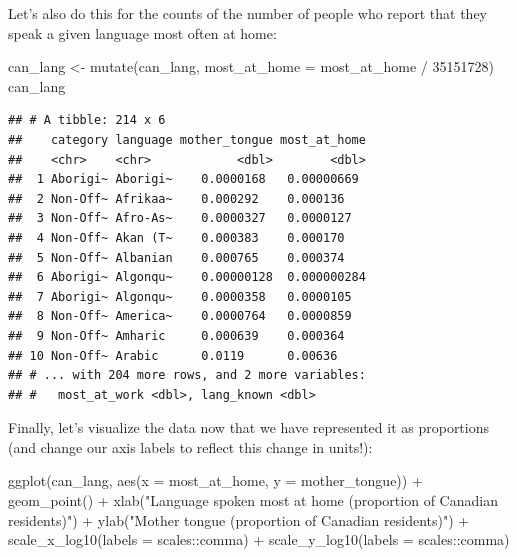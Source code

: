 \documentclass[
]{krantz}
\makeatletter
\newenvironment{Shaded}{\begin{snugshade}}{\end{snugshade}}
\newcommand{\AttributeTok}[1]{\textcolor[rgb]{0.61,0.61,0.61}{#1}}
\newcommand{\DecValTok}[1]{\textcolor[rgb]{0.06,0.06,0.06}{#1}}
\newcommand{\FunctionTok}[1]{\textcolor[rgb]{0,0,0}{#1}}
\newcommand{\NormalTok}[1]{#1}
\newcommand{\OtherTok}[1]{\textcolor[rgb]{0.37,0.37,0.37}{#1}}
\newcommand{\SpecialCharTok}[1]{\textcolor[rgb]{0,0,0}{#1}}
\newcommand{\StringTok}[1]{\textcolor[rgb]{0.5,0.5,0.5}{#1}}
\newenvironment{kframe}{%
\medskip{}
\setlength{\fboxsep}{.8em}
 \def\at@end@of@kframe{}%
 \ifinner\ifhmode%
  \def\at@end@of@kframe{\end{minipage}}%
  \begin{minipage}{\columnwidth}%
 \fi\fi%
 \def\FrameCommand##1{\hskip\@totalleftmargin \hskip-\fboxsep
 \colorbox{shadecolor}{##1}\hskip-\fboxsep
     \hskip-\linewidth \hskip-\@totalleftmargin \hskip\columnwidth}%
 \MakeFramed {\advance\hsize-\width
   \@totalleftmargin\z@ \linewidth\hsize
   \@setminipage}}%
 {\par\unskip\endMakeFramed%
 \at@end@of@kframe}
\renewenvironment{Shaded}{\begin{kframe}}{\end{kframe}}
\makeatother
\begin{document}
Let's also do this for the counts of the number of people who report that they speak a given language most often at home:

\begin{Shaded}
\begin{Highlighting}[]
\NormalTok{can\_lang }\OtherTok{\textless{}{-}} \FunctionTok{mutate}\NormalTok{(can\_lang, }\AttributeTok{most\_at\_home =}\NormalTok{ most\_at\_home }\SpecialCharTok{/} \DecValTok{35151728}\NormalTok{)}
\NormalTok{can\_lang}
\end{Highlighting}
\end{Shaded}

\begin{verbatim}
## # A tibble: 214 x 6
##    category language mother_tongue most_at_home
##    <chr>    <chr>            <dbl>        <dbl>
##  1 Aborigi~ Aborigi~    0.0000168   0.00000669 
##  2 Non-Off~ Afrikaa~    0.000292    0.000136   
##  3 Non-Off~ Afro-As~    0.0000327   0.0000127  
##  4 Non-Off~ Akan (T~    0.000383    0.000170   
##  5 Non-Off~ Albanian    0.000765    0.000374   
##  6 Aborigi~ Algonqu~    0.00000128  0.000000284
##  7 Aborigi~ Algonqu~    0.0000358   0.0000105  
##  8 Non-Off~ America~    0.0000764   0.0000859  
##  9 Non-Off~ Amharic     0.000639    0.000364   
## 10 Non-Off~ Arabic      0.0119      0.00636    
## # ... with 204 more rows, and 2 more variables:
## #   most_at_work <dbl>, lang_known <dbl>
\end{verbatim}

Finally, let's visualize the data now that we have represented it as proportions (and change our axis labels to reflect this change in units!):

\begin{Shaded}
\begin{Highlighting}[]
\FunctionTok{ggplot}\NormalTok{(can\_lang, }\FunctionTok{aes}\NormalTok{(}\AttributeTok{x =}\NormalTok{ most\_at\_home, }\AttributeTok{y =}\NormalTok{ mother\_tongue)) }\SpecialCharTok{+}
  \FunctionTok{geom\_point}\NormalTok{() }\SpecialCharTok{+}
  \FunctionTok{xlab}\NormalTok{(}\StringTok{"Language spoken most at home (proportion of Canadian residents)"}\NormalTok{) }\SpecialCharTok{+}
  \FunctionTok{ylab}\NormalTok{(}\StringTok{"Mother tongue (proportion of Canadian residents)"}\NormalTok{) }\SpecialCharTok{+}
  \FunctionTok{scale\_x\_log10}\NormalTok{(}\AttributeTok{labels =}\NormalTok{ scales}\SpecialCharTok{::}\NormalTok{comma) }\SpecialCharTok{+}
  \FunctionTok{scale\_y\_log10}\NormalTok{(}\AttributeTok{labels =}\NormalTok{ scales}\SpecialCharTok{::}\NormalTok{comma)}
\end{Highlighting}
\end{Shaded}
\end{document}
